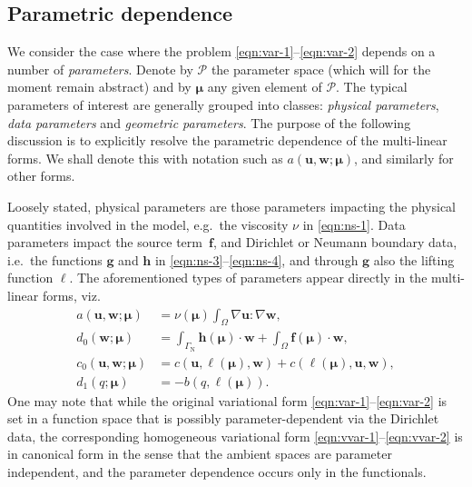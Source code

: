 \documentclass[onecolumn, twoside, a4paper, 11pt]{article}
\begin{document}
\subsection{Parametric dependence}
\label{sec:pardep}

We consider the case where the problem \eqref{eqn:var-1}--\eqref{eqn:var-2}
depends on a number of \emph{parameters}. Denote by $\mathcal{P}$ the parameter
space (which will for the moment remain abstract) and by $\bm \mu$ any given
element of $\mathcal{P}$. The typical parameters of interest are generally
grouped into classes: \emph{physical parameters}, \emph{data parameters}
and \emph{geometric parameters}. The purpose of the following
discussion is to explicitly resolve the parametric dependence of the multi-linear forms.
We shall denote this with notation such as $a(\bm u, \bm w; \bm\mu)$, and similarly for other forms.

Loosely stated, physical parameters are those parameters impacting the physical
quantities involved in the model, e.g.~the viscosity $\nu$ in
\eqref{eqn:ns-1}. Data parameters impact the source term~$\bm{f}$, and Dirichlet or Neumann
boundary data, i.e.~the functions $\bm g$ and $\bm h$ in
\eqref{eqn:ns-3}--\eqref{eqn:ns-4}, and through $\bm g$ also the lifting
function $\bm \ell$. The aforementioned types of parameters appear directly in
the multi-linear forms, viz.
%
\begin{align}
  a(\bm u, \bm w; \bm \mu) &= \nu(\bm \mu) \int_\Omega \nabla \bm u : \nabla \bm w, \\
  d_0(\bm w; \bm \mu) &= \int_{\Gamma_\text{N}} \bm h(\bm \mu) \cdot \bm w
                        + \int_{\Omega} \bm{f}(\bm{\mu}) \cdot \bm w, \\
  c_0(\bm u, \bm w; \bm \mu) &= c(\bm u, \bm \ell(\bm \mu), \bm w) + c(\bm \ell(\bm \mu), \bm u, \bm w), \\
  d_1(q; \bm \mu) &= - b(q, \bm \ell(\bm \mu)).
\end{align}
%
One may note that while the original variational form
\eqref{eqn:var-1}--\eqref{eqn:var-2} is set in a function space that is
possibly parameter-dependent via the Dirichlet data, the corresponding homogeneous variational form
\eqref{eqn:vvar-1}--\eqref{eqn:vvar-2} is in canonical form in the sense that the
ambient spaces are parameter independent, and the parameter dependence occurs only in
the functionals.
\end{document}
